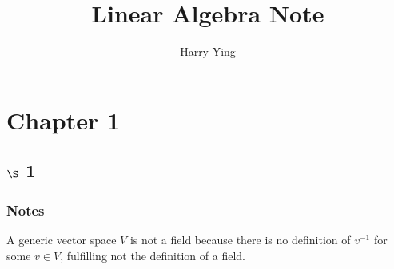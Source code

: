 \documentclass[11pt]{article}
\author{Harry Ying}
\date{}
\title{Linear Algebra Note}
\begin{document}
\maketitle
\tableofcontents \clearpage
\section{Chapter 1}
\label{sec:orgf02a809}
\subsection{\(\S\) 1}
\label{sec:orgdb9cd73}
\subsubsection{Notes}
\label{sec:orgaacf333}
A generic vector space \(V\) is not a field because there is no definition of \(v^{-1}\) for some \(v\in V\), fulfilling not the definition of a field.\\
\end{document}
